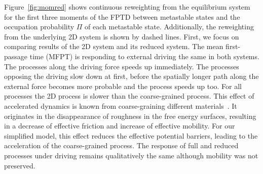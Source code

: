 Figure~\ref{fig:momred} shows continuous reweighting from the equilibrium system for the first three moments of the FPTD between metastable states and the occupation probability $\Pi$ of each metastable state. Additionally, the reweighting from the underlying 2D system is shown by dashed lines. First, we focus on comparing results of the 2D system and its reduced system. The mean first-passage time (MFPT) is responding to external driving the same in both systems. The processes along the driving force speeds up immediately. The processes opposing the driving slow down at first, before the spatially longer path along the external force becomes more probable and the process speeds up too. For all processes the 2D process is slower than the coarse-grained process. This effect of accelerated dynamics is known from coarse-graining different materials~\cite{rudzinski2019recent,depa2005speed,guenza2015thermodynamic,meinel2020loss}. It originates in the disappearance of roughness in the free energy surfaces, resulting in a decrease of effective friction and increase of effective mobility. For our simplified model, this effect reduces the effective potential barriers, leading to the acceleration of the coarse-grained process. The response of full and reduced processes under driving remains qualitatively the same although mobility was not preserved.  

